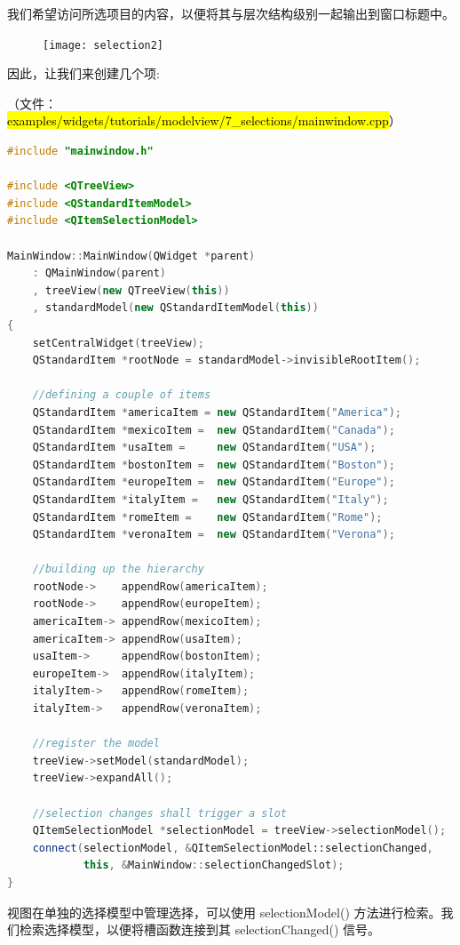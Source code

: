 我们希望访问所选项目的内容，以便将其与层次结构级别一起输出到窗口标题中。

\begin{figure}[hbt!]  
\texttt{[image: selection2]}
\end{figure}

因此，让我们来创建几个项:

（文件： \hl{examples/widgets/tutorials/modelview/7\_selections/mainwindow.cpp}）

\begin{lstlisting}[language=C++]
#include "mainwindow.h"

#include <QTreeView>
#include <QStandardItemModel>
#include <QItemSelectionModel>

MainWindow::MainWindow(QWidget *parent)
    : QMainWindow(parent)
    , treeView(new QTreeView(this))
    , standardModel(new QStandardItemModel(this))
{
    setCentralWidget(treeView);
    QStandardItem *rootNode = standardModel->invisibleRootItem();

    //defining a couple of items
    QStandardItem *americaItem = new QStandardItem("America");
    QStandardItem *mexicoItem =  new QStandardItem("Canada");
    QStandardItem *usaItem =     new QStandardItem("USA");
    QStandardItem *bostonItem =  new QStandardItem("Boston");
    QStandardItem *europeItem =  new QStandardItem("Europe");
    QStandardItem *italyItem =   new QStandardItem("Italy");
    QStandardItem *romeItem =    new QStandardItem("Rome");
    QStandardItem *veronaItem =  new QStandardItem("Verona");

    //building up the hierarchy
    rootNode->    appendRow(americaItem);
    rootNode->    appendRow(europeItem);
    americaItem-> appendRow(mexicoItem);
    americaItem-> appendRow(usaItem);
    usaItem->     appendRow(bostonItem);
    europeItem->  appendRow(italyItem);
    italyItem->   appendRow(romeItem);
    italyItem->   appendRow(veronaItem);

    //register the model
    treeView->setModel(standardModel);
    treeView->expandAll();

    //selection changes shall trigger a slot
    QItemSelectionModel *selectionModel = treeView->selectionModel();
    connect(selectionModel, &QItemSelectionModel::selectionChanged,
            this, &MainWindow::selectionChangedSlot);
}
\end{lstlisting}

视图在单独的选择模型中管理选择，可以使用 selectionModel() 方法进行检索。我们检索选择模型，以便将槽函数连接到其 selectionChanged() 信号。

